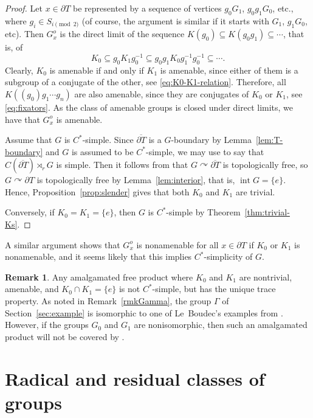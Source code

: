 \documentclass[a4paper]{amsart}
\theoremstyle{plain}
\theoremstyle{definition}
\newtheorem{remark}[theorem]{Remark}
\theoremstyle{remark}
\numberwithin{theorem}{section}
\begin{document}
\begin{proof}
Let $x\in\partial T$ be represented by a sequence of vertices $g_0G_1$, $g_0g_1G_0$, etc., where $g_i\in S_{i\pmod 2}$
(of course, the argument is similar if it starts with $G_1$, $g_1G_0$, etc).
Then $G_x^o$ is the direct limit of the sequence $K(g_0)\subseteq K(g_0g_1)\subseteq\dotsb$, that is, of
\[
K_0 \subseteq g_0K_1g_0^{-1} \subseteq g_0g_1K_0g_1^{-1}g_0^{-1} \subseteq \dotsb.
\]
Clearly, $K_0$ is amenable if and only if $K_1$ is amenable,
since either of them is a subgroup of a conjugate of the other, see \eqref{eq:K0-K1-relation}.
Therefore, all $K((g_0)g_1\dotsm g_n)$ are also amenable, since they are conjugates of $K_0$ or $K_1$, see \eqref{eq:fixators}.
As the class of amenable groups is closed under direct limits, we have that $G_x^o$ is amenable.

Assume that $G$ is $C^*$-simple.
Since $\overline{\partial T}$ is a $G$-boundary by Lemma~\ref{lem:T-boundary} and $G$ is assumed to be $C^*$-simple,
we may use \cite[Corollary~7.5]{BKKO} to say that $C(\overline{\partial T})\rtimes_r G$ is simple.
Then it follows from \cite[Theorem~14~(2)]{Ozawa} that $G \curvearrowright \overline{\partial T}$ is topologically free,
so $G \curvearrowright \partial T$ is topologically free by Lemma~\ref{lem:interior}, that is, $\operatorname{int}G=\{e\}$.
Hence, Proposition~\ref{prop:slender} gives that both $K_0$ and $K_1$ are trivial.

Conversely, if $K_0=K_1=\{e\}$, then $G$ is $C^*$-simple by Theorem~\ref{thm:trivial-Ks}.
\end{proof}

A similar argument shows that $G_x^o$ is nonamenable for all $x\in\partial T$ if $K_0$ or $K_1$ is nonamenable,
and it seems likely that this implies $C^*$-simplicity of $G$.

\begin{remark}
Any amalgamated free product where $K_0$ and $K_1$ are nontrivial, amenable, and $K_0 \cap K_1=\{e\}$ is not $C^*$-simple, but has the unique trace property.
As noted in Remark~\ref{rmkGamma}, the group $\Gamma$ of Section~\ref{sec:example} is isomorphic to one of Le~Boudec's examples from \cite[Section~5]{Boudec}.
However, if the groups $G_0$ and $G_1$ are nonisomorphic, then such an amalgamated product will not be covered by \cite[Section~5]{Boudec}.  
\end{remark}


\section{Radical and residual classes of groups}\label{sec:radical}
\end{document}
